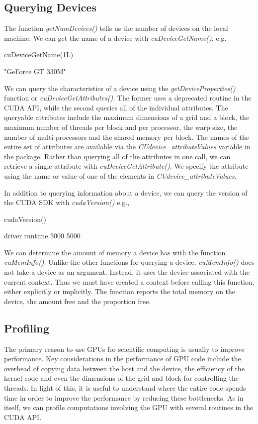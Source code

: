 \documentclass[article]{jss}
\def\R{\proglang{R}}
\def\Rfunc#1{\textsl{#1()}}
\def\Rvar#1{\textsl{#1}}
\begin{document}
\subsection{Querying Devices}
The function \Rfunc{getNumDevices} tells us the number of devices on
the local machine.  
We can get the name of a device with \Rfunc{cuDeviceGetName}, e.g.
\begin{RCode}
cuDeviceGetName(1L)
\end{RCode}
\begin{ROutput}
[1] "GeForce GT 330M"
\end{ROutput}
We can query the characteristics of a device using
the \Rfunc{getDeviceProperties} function or
\Rfunc{cuDeviceGetAttributes}.  The former uses a deprecated routine
in the CUDA API, while the second queries all of the individual
attributes.  The queryable attributes include the maximum dimensions
of a grid and a block, the maximum number of threads per block and per
processor, the warp size, the number of multi-processors and the shared
memory per block.  The names of the entire set of attributes are
available  via the \Rvar{CUdevice\_attributeValues} variable in the package.
Rather than querying all of the attributes in one call,
we can retrieve a single attribute with \Rfunc{cuDeviceGetAttribute}.
We specify the attribute using the name or value of one 
of the elements in \Rvar{CUdevice\_attributeValues}.


In addition to querying information about a device,
we can query the version of the CUDA SDK with
\Rfunc{cudaVersion} e.g.,
\begin{RCode}
cudaVersion()
\end{RCode}
\begin{ROutput}
 driver runtime 
   5000    5000 
\end{ROutput}


We can determine the amount of memory a device has with the function
\Rfunc{cuMemInfo}. Unlike the other functions for querying a device,
\Rfunc{cuMemInfo} does not take a device as an argument. Instead, it uses the device
associated with the current context.  Thus we must have created a
context before calling this function, either explicitly or implicitly.
The function reports the total memory on the device, the amount free
and the proportion free.


\subsection{Profiling}
The primary reason to use GPUs for scientific computing is usually to improve
performance. Key considerations in the performance of GPU code include 
the overhead of copying data between the host and the device, the 
efficiency of the kernel code and even the
dimensions of the grid and block for controlling the threads.
In light of this, it is
useful to understand where the entire code spends time in order to
improve the performance by reducing these bottlenecks.  As in \R{}
itself, we can profile computations involving the GPU with several
routines in the CUDA API.
\end{document}
